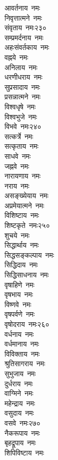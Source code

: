 \begin{multicols}{2}
\begin{flushleft}
आवर्तनाय~नमः\\
निवृत्तात्मने~नमः\\
संवृताय~नमः\hfill २३०\\
सम्प्रमर्दनाय~नमः\\
अहःसंवर्तकाय~नमः\\
वह्नये~नमः\\
अनिलाय~नमः\\
धरणीधराय~नमः\\
सुप्रसादाय~नमः\\
प्रसन्नात्मने~नमः\\
विश्वधृषे~नमः\\
विश्वभुजे~नमः\\
विभवे~नमः\hfill २४०\\
सत्कर्त्रे~नमः\\
सत्कृताय~नमः\\
साधवे~नमः\\
जह्नवे~नमः\\
नारायणाय~नमः\\
नराय~नमः\\
असङ्ख्येयाय~नमः\\
अप्रमेयात्मने~नमः\\
विशिष्टाय~नमः\\
शिष्टकृते~नमः\hfill २५०\\
शुचये~नमः\\
सिद्धार्थाय~नमः\\
सिद्धसङ्कल्पाय~नमः\\
सिद्धिदाय~नमः\\
सिद्धिसाधनाय~नमः\\
वृषाहिणे~नमः\\
वृषभाय~नमः\\
विष्णवे~नमः\\
वृषपर्वणे~नमः\\
वृषोदराय~नमः\hfill २६०\\
वर्धनाय~नमः\\
वर्धमानाय~नमः\\
विविक्ताय~नमः\\
श्रुतिसागराय~नमः\\
सुभुजाय~नमः\\
दुर्धराय~नमः\\
वाग्मिने~नमः\\
महेन्द्राय~नमः\\
वसुदाय~नमः\\
वसवे~नमः\hfill २७०\\
नैकरूपाय~नमः\\
बृहद्रूपाय~नमः\\
शिपिविष्टाय~नमः\\

\end{flushleft}
\end{multicols}
